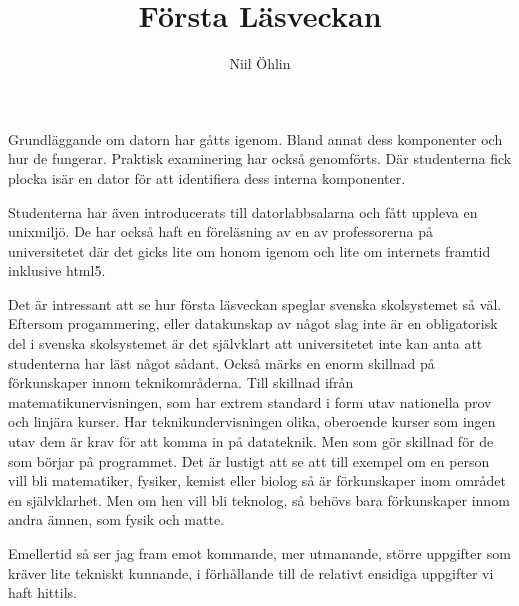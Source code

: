 \documentclass{article}
\begin{document}
\title{Första Läsveckan}
\author{Niil Öhlin}
\date{}
\maketitle

Grundläggande om datorn har gåtts igenom. Bland annat dess komponenter och hur
de fungerar. Praktisk examinering har också genomförts. Där studenterna 
fick plocka isär en dator för att identifiera dess interna komponenter.

Studenterna har även introducerats till datorlabbsalarna och fått uppleva en
unixmiljö. De har också haft en föreläsning av en av professorerna på 
universitetet där det gicks lite om honom igenom och lite om internets framtid
inklusive html5.

Det är intressant att se hur första läsveckan speglar svenska skolsystemet så
väl.
Eftersom progammering, eller datakunskap av något slag inte är en obligatorisk 
del i svenska skolsystemet är det självklart att universitetet inte kan anta att
studenterna har läst något sådant. Också märks en enorm skillnad på förkunskaper
innom teknikområderna. Till skillnad ifrån matematikunervisningen, som har
extrem standard i form utav nationella prov och linjära kurser. Har 
teknikundervisningen olika, oberoende kurser som ingen utav dem är krav för
att komma in på datateknik. Men som gör skillnad för de som börjar på 
programmet. Det är lustigt att se att till exempel om en person vill
bli matematiker, fysiker, kemist eller biolog så är förkunskaper
inom området en självklarhet. Men om hen vill bli teknolog, så behövs bara
förkunskaper innom andra ämnen, som fysik och matte.

Emellertid så ser jag fram emot kommande, mer utmanande, större uppgifter 
som kräver lite tekniskt kunnande, i förhållande till de relativt ensidiga 
uppgifter vi haft hittils.
\end{document}
